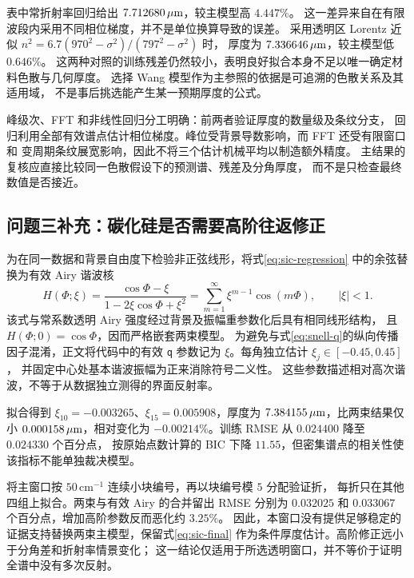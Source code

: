 

表中常折射率回归给出 $7.712680\,\mu\mathrm{m}$，较主模型高 $4.447\%$。
这一差异来自在有限波段内采用不同相位梯度，并不是单位换算导致的误差。
采用透明区 Lorentz 近似
$n^2=6.7(970^2-\sigma^2)/(797^2-\sigma^2)$ 时，
厚度为 $7.336646\,\mu\mathrm{m}$，较主模型低 $0.646\%$。
这两种对照的训练残差仍然较小，表明良好拟合本身不足以唯一确定材料色散与几何厚度。
选择 Wang 模型作为主参照的依据是可追溯的色散关系及其适用域，
不是事后挑选能产生某一预期厚度的公式。

峰级次、FFT 和非线性回归分工明确：前两者验证厚度的数量级及条纹分支，
回归利用全部有效谱点估计相位梯度。峰位受背景导数影响，而 FFT 还受有限窗口和
变周期条纹展宽影响，因此不将三个估计机械平均以制造额外精度。
主结果的复核应直接比较同一色散假设下的预测谱、残差及分角厚度，
而不是只检查最终数值是否接近。

\subsection{问题三补充：碳化硅是否需要高阶往返修正}
为在同一数据和背景自由度下检验非正弦线形，将式\eqref{eq:sic-regression}
中的余弦替换为有效 Airy 谐波核
\begin{equation}
 H(\Phi;\xi)=\frac{\cos\Phi-\xi}{1-2\xi\cos\Phi+\xi^2}
 =\sum_{m=1}^{\infty}\xi^{m-1}\cos(m\Phi),\qquad |\xi|<1.
 \label{eq:sic-airy-kernel}
\end{equation}
该式与常系数透明 Airy 强度经过背景及振幅重参数化后具有相同线形结构，
且 $H(\Phi;0)=\cos\Phi$，因而严格嵌套两束模型。
为避免与式\eqref{eq:snell-q}的纵向传播因子混淆，正文将代码中的有效
\texttt{q} 参数记为 $\xi$。每角独立估计 $\xi_j\in[-0.45,0.45]$，
并固定中心处基本谐波振幅为正来消除符号二义性。
这些参数描述相对高次谐波，不等于从数据独立测得的界面反射率。

拟合得到 $\xi_{10}=-0.003265$、$\xi_{15}=0.005908$，厚度为
$7.384155\,\mu\mathrm{m}$，比两束结果仅小 $0.000158\,\mu\mathrm{m}$，相对变化为
$-0.00214\%$。训练 RMSE 从 $0.024400$ 降至 $0.024330$ 个百分点，
按原始点数计算的 BIC 下降 $11.55$，但密集谱点的相关性使该指标不能单独裁决模型。

将主窗口按 $50\,\mathrm{cm}^{-1}$ 连续小块编号，再以块编号模 $5$ 分配验证折，
每折只在其他四组上拟合。两束与有效 Airy 的合并留出 RMSE 分别为
$0.032025$ 和 $0.033067$ 个百分点，增加高阶参数反而恶化约 $3.25\%$。
因此，本窗口没有提供足够稳定的证据支持替换两束主模型，保留式\eqref{eq:sic-final}
作为条件厚度估计。高阶修正远小于分角差和折射率情景变化；
这一结论仅适用于所选透明窗口，并不等价于证明全谱中没有多次反射。

